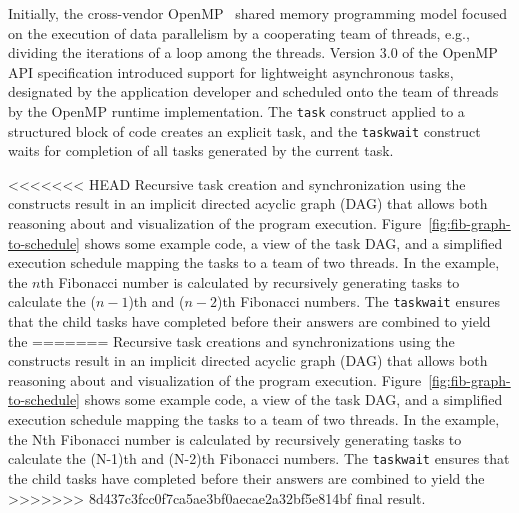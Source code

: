 \documentclass[sigconf]{acmart}
\newcommand{\figref}[1]         {Figure~\ref{fig:#1}}
\begin{document}
Initially, the cross-vendor OpenMP~\cite{openmp} shared memory programming model
focused on the execution of data parallelism by a cooperating team of threads,
e.g., dividing the iterations of a loop among the threads. Version 3.0 of the
OpenMP API specification introduced support for lightweight asynchronous tasks,
designated by the application developer and scheduled onto the team of threads
by the OpenMP runtime implementation.  The \texttt{task} construct applied to
a structured block of code creates an explicit task, and the \texttt{taskwait}
construct waits for completion of all tasks generated by the current task.

<<<<<<< HEAD
Recursive task creation and synchronization using the constructs result in 
an implicit directed acyclic graph (DAG) that allows both reasoning about and 
visualization of the program execution.  \figref{fib-graph-to-schedule}
shows some example code, a view of the task DAG, and a simplified execution 
schedule mapping the tasks to a team of two threads.  In the example, the $n$th 
Fibonacci number is calculated by recursively generating tasks to calculate 
the ($n-1$)th and ($n-2$)th Fibonacci numbers.  The \texttt{taskwait} ensures that 
the child tasks have completed before their answers are combined to yield the 
=======
Recursive task creations and synchronizations using the constructs result in
an implicit directed acyclic graph (DAG) that allows both reasoning about and
visualization of the program execution.  \figref{fib-graph-to-schedule}
shows some example code, a view of the task DAG, and a simplified execution
schedule mapping the tasks to a team of two threads.  In the example, the Nth
Fibonacci number is calculated by recursively generating tasks to calculate
the (N-1)th and (N-2)th Fibonacci numbers.  The \texttt{taskwait} ensures that
the child tasks have completed before their answers are combined to yield the
>>>>>>> 8d437c3fcc0f7ca5ae3bf0aecae2a32bf5e814bf
final result.
\end{document}

